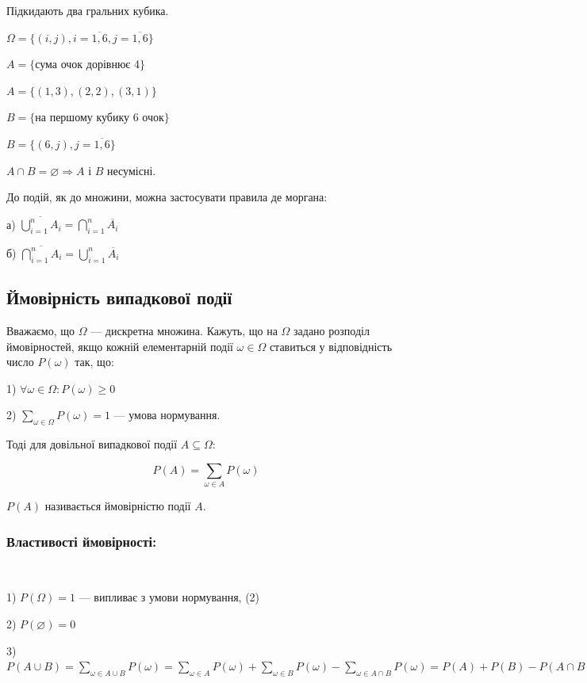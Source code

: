 \begin{example}
    Підкидають два гральних кубика.

    $\Omega = \{(i,j), i=\overline{1,6}, j=\overline{1,6}\}$

    $A = \{$сума очок дорівнює 4$\}$

    $A = \{(1,3), (2,2), (3,1)\}$

    $B = \{$на першому кубику 6 очок$\}$

    $B = \{(6,j), j = \overline{1,6}\}$

    $A \cap B = \varnothing \Rightarrow A$ і $B$ несумісні.
\end{example}

\begin{remark}
    До подій, як до множини, можна застосувати правила де
    моргана:

    а) $\overline{\bigcup\limits_{i=1}^n A_i}
    = \bigcap\limits_{i=1}^n \overline{A_i}$

    б) $\overline{\bigcap\limits_{i=1}^n A_i}
    = \bigcup\limits_{i=1}^n \overline{A_i}$
\end{remark}

\subsection{Ймовірність випадкової події}

Вважаємо, що $\Omega$ --- дискретна множина. Кажуть, що на 
$\Omega$ задано розподіл ймовірностей, якщо кожній елементарній
події $\omega \in \Omega$ ставиться у відповідність число
$P(\omega)$ так, що:

1) $\forall \omega \in \Omega: P(\omega) \geqslant 0$

2) $\sum\limits_{\omega \in \Omega} P(\omega) = 1$ --- умова
нормування.

Тоді для довільної випадкової події $A \subseteq \Omega:$

$$P(A) = \sum\limits_{\omega \in A} P(\omega)$$

$P(A)$ називається ймовірністю події $A$.

\subsubsection*{Властивості ймовірності:}~

1) $P(\Omega) = 1$ --- випливає з умови нормування, (2)

2) $P(\varnothing) = 0$

3) $P(A \cup B)
= \sum\limits_{\omega \in A \cup B} P(\omega)
= \sum\limits_{\omega \in A} P(\omega)
    + \sum\limits_{\omega \in B} P(\omega)
    - \sum\limits_{\omega \in A \cap B} P(\omega)
= P(A) + P(B) - P(A \cap B)$

